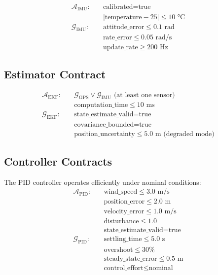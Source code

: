 \begin{contract}
\label{contract:imu}
\begin{align*}
    \mathcal{A}_{\text{IMU}}: \quad & \text{calibrated} = \text{true} \\
    & |\text{temperature} - 25| \leq 10 \text{ °C} \\[6pt]
    \mathcal{G}_{\text{IMU}}: \quad & \text{attitude\_error} \leq 0.1 \text{ rad} \\
    & \text{rate\_error} \leq 0.05 \text{ rad/s} \\
    & \text{update\_rate} \geq 200 \text{ Hz}
\end{align*}
\end{contract}

\subsection{Estimator Contract}

\begin{contract}
\label{contract:ekf}
\begin{align*}
    \mathcal{A}_{\text{EKF}}: \quad & \mathcal{G}_{\text{GPS}} \lor \mathcal{G}_{\text{IMU}} \text{ (at least one sensor)} \\
    & \text{computation\_time} \leq 10 \text{ ms} \\[6pt]
    \mathcal{G}_{\text{EKF}}: \quad & \text{state\_estimate\_valid} = \text{true} \\
    & \text{covariance\_bounded} = \text{true} \\
    & \text{position\_uncertainty} \leq 5.0 \text{ m (degraded mode)}
\end{align*}
\end{contract}

\subsection{Controller Contracts}

\begin{contract}
\label{contract:pid}
The PID controller operates efficiently under nominal conditions:
\begin{align*}
    \mathcal{A}_{\text{PID}}: \quad & \text{wind\_speed} \leq 3.0 \text{ m/s} \\
    & \text{position\_error} \leq 2.0 \text{ m} \\
    & \text{velocity\_error} \leq 1.0 \text{ m/s} \\
    & \text{disturbance} \leq 1.0 \\
    & \text{state\_estimate\_valid} = \text{true} \\[6pt]
    \mathcal{G}_{\text{PID}}: \quad & \text{settling\_time} \leq 5.0 \text{ s} \\
    & \text{overshoot} \leq 30\% \\
    & \text{steady\_state\_error} \leq 0.5 \text{ m} \\
    & \text{control\_effort} \leq \text{nominal}
\end{align*}
\end{contract}

